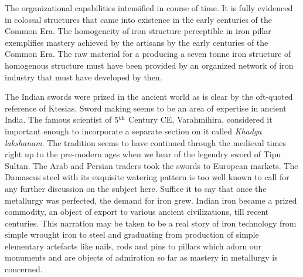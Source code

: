 The organizational capabilities intensified in course of time. It is fully evidenced in colossal structures that came into existence in the early centuries of the Common Era. The homogeneity of iron structure perceptible in iron pillar exemplifies mastery achieved by the artisans by the early centuries of the Common Era. The raw material for a producing a seven tonne iron structure of homogenous structure must have been provided by an organized network of iron industry that must have developed by then.

The Indian swords were prized in the ancient world as is clear by the oft-quoted reference of Ktesias. Sword making seems to be an area of expertise in ancient India. The famous scientist of $5^{\rm th}$ Century CE, Varahmihira, considered it important enough to incorporate a separate section on it called {\it Khadga lakshanam}. The tradition seems to have continued through the medieval times right up to the pre-modern ages when we hear of the legendry sword of Tipu Sultan. The Arab and Persian traders took the swords to European markets. The Damascus steel with its exquisite watering pattern is too well known to call for any further discussion on the subject here. Suffice it to say that once the metallurgy was perfected, the demand for iron grew. Indian iron became a prized commodity, an object of export to various ancient civilizations, till recent centuries. This narration may be taken to be a real story of iron technology from simple wrought iron to steel and graduating from production of simple elementary artefacts like nails, rods and pins to pillars which adorn our monuments and are objects of admiration so far as mastery in metallurgy is concerned. 


\newpage

